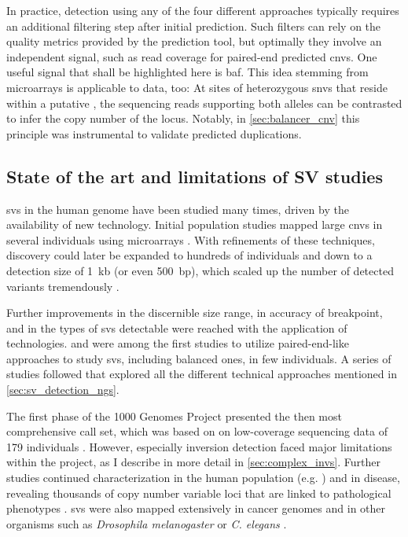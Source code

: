 In practice, \sv detection using any of the four different approaches typically
requires an additional filtering step after initial \sv prediction. Such
filters can rely on the quality metrics provided by the prediction tool, but
optimally they involve an independent signal, such as read coverage for
paired-end predicted \acp{cnv}. One useful signal that shall be highlighted here
is \acl{baf}. This idea stemming from microarrays is applicable to \mps data,
too: At sites of heterozygous \acp{snv} that reside within a putative \sv, the
sequencing reads supporting both alleles can be contrasted to infer the copy
number of the locus. Notably, in \cref{sec:balancer_cnv} this principle was
instrumental to validate predicted duplications.





\subsection{State of the art and limitations of SV studies}
\label{sec:limitations}

\Aclp{sv} in the human genome have been studied many times, driven by the
availability of new technology. Initial population studies mapped large \acp{cnv}
in several individuals using microarrays \citep{Sebat2004,Iafrate2004,Sharp2005,Redon2006}.
With refinements of these techniques, \cnv discovery could later be expanded to
hundreds of individuals and down to a detection size of 1~kb (or even 500~bp),
which scaled up the number of detected variants tremendously
\citep{McCarroll2008,Conrad2010}.

Further improvements in the discernible size
range, in accuracy of breakpoint, and in the types of \acp{sv} detectable  were reached
with the application of \mps technologies. \citet{Korbel2007} and \citet{Kidd2008}
were among the first studies to utilize paired-end-like approaches to study
\acp{sv}, including balanced ones, in few individuals. A series of studies
followed that explored all the different technical approaches mentioned in
\cref{sec:sv_detection_ngs}.

The first phase of the 1000 Genomes Project presented the then most
comprehensive \sv call set, which was based on on low-coverage sequencing data
of 179 individuals \citep{Mills2011}. However, especially inversion detection
faced major limitations within the project, as I describe in more detail in
\cref{sec:complex_invs}. Further studies continued \sv characterization in the
human population (e.g. \citep{Sudmant2015a,Hehir-Kwa2016}) and in disease,
revealing thousands of copy number variable loci that are linked to pathological
phenotypes \citep{Swaminathan2012,Forbes2011}. \Acp{sv} were also mapped extensively in
cancer genomes \citep{Weischenfeldt2016,Campbell2017} and in other organisms such
as \textit{Drosophila melanogaster} \citep{Massouras2012,Zichner2013} or
\textit{C. elegans} \citep{Maydan2010}.

